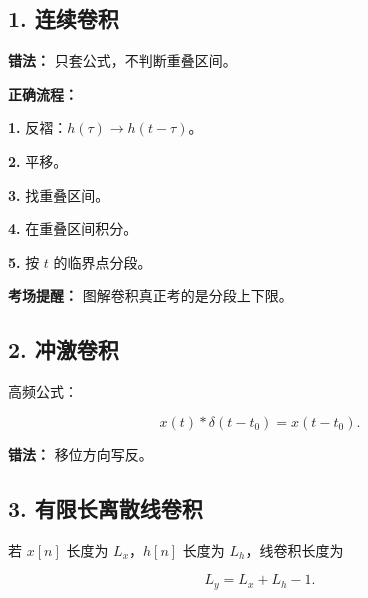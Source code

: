 \documentclass[11pt]{ctexart}
\begin{document}
\subsection*{1. 连续卷积}



\textbf{错法：} 只套公式，不判断重叠区间。\par



\textbf{正确流程：}\par



\noindent\textbf{1.} 反褶：\(h(\tau)\to h(t-\tau)\)。\par

\noindent\textbf{2.} 平移。\par

\noindent\textbf{3.} 找重叠区间。\par

\noindent\textbf{4.} 在重叠区间积分。\par

\noindent\textbf{5.} 按 \(t\) 的临界点分段。\par



\textbf{考场提醒：} 图解卷积真正考的是分段上下限。\par



\subsection*{2. 冲激卷积}



高频公式：\par

\[

x(t)*\delta(t-t_0)=x(t-t_0).

\]



\textbf{错法：} 移位方向写反。\par



\subsection*{3. 有限长离散线卷积}



若 \(x[n]\) 长度为 \(L_x\)，\(h[n]\) 长度为 \(L_h\)，线卷积长度为\par

\[

L_y=L_x+L_h-1.

\]
\end{document}
